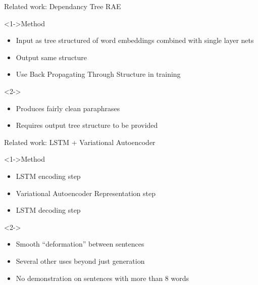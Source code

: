 \documentclass[]{beamer}
\begin{document}


\begin{frame}{Related work: Dependancy Tree RAE}
	\begin{block}<1->{Method}
		\begin{itemize}
			\item Input as tree structured of word embeddings combined with single layer nets
			\item Output same structure
			\item Use Back Propagating Through Structure in training
		\end{itemize}
	\end{block}
	\begin{block}<2->{}
		\begin{itemize}
			\item Produces fairly clean paraphrases 
			\item Requires output tree structure to be provided
		\end{itemize}
	\end{block}
\end{frame}



\begin{frame}{Related work: LSTM + Variational Autoencoder}
	\begin{block}<1->{Method}
			\begin{itemize}
				\item LSTM encoding step
				\item Variational Autoencoder Representation step
				\item LSTM decoding step
			\end{itemize}
	\end{block}
	\begin{block}<2->{}
		\begin{itemize}
			\item Smooth ``deformation'' between sentences
			\item Several other uses beyond just generation
			\item No demonstration on sentences with more than 8 words
		\end{itemize}
	\end{block}
\end{frame}

\end{document}
